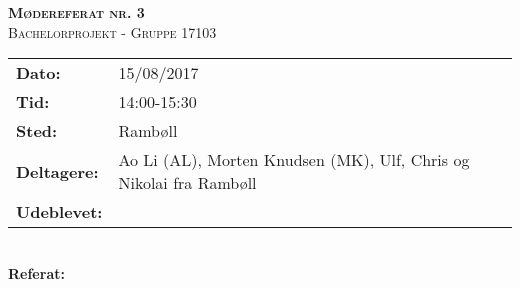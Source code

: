 
\newcommand{\HRule}{\rule{\linewidth}{0.1mm}}


	\begin{center}
		{\huge \bfseries \textsc{Mødereferat nr. 3}}\\
		\textsc{\large Bachelorprojekt - Gruppe 17103}\\[0.3cm]
	\end{center}
	\begin{tabular}{ll}
	\large \textbf{Dato:} & 15/08/2017  	\\ %
	\large \textbf{Tid:}  & 14:00-15:30 	\\ %
	\large \textbf{Sted:} & Rambøll		\\ %
	\large \textbf{Deltagere:} & Ao Li (AL), Morten Knudsen (MK), Ulf, Chris og Nikolai fra Rambøll \\
	\large \textbf{Udeblevet:}
	\end{tabular}\\
	\phantom{\,}\hspace{0.1em} \large \textbf{Referat:}

